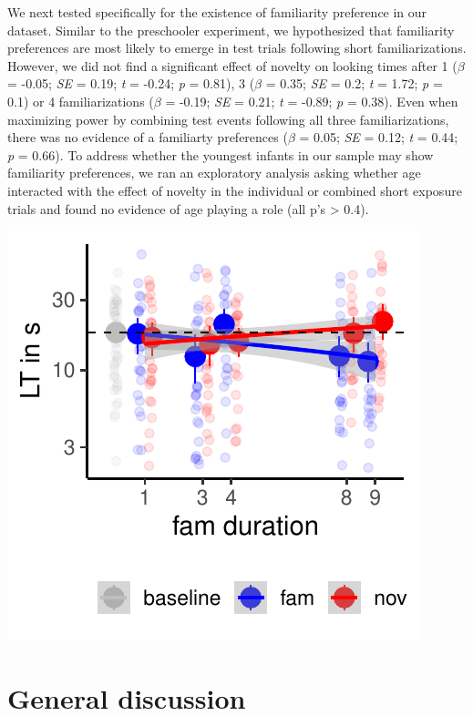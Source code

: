 \documentclass[10pt, letterpaper]{article}
\newenvironment{CodeChunk}{}{}
\begin{document}
We next tested specifically for the existence of familiarity preference
in our dataset. Similar to the preschooler experiment, we hypothesized
that familiarity preferences are most likely to emerge in test trials
following short familiarizations. However, we did not find a significant
effect of novelty on looking times after 1 (\(\beta\) = -0.05; \emph{SE}
= 0.19; \emph{t} = -0.24; \emph{p} = 0.81), 3 (\(\beta\) = 0.35;
\emph{SE} = 0.2; \emph{t} = 1.72; \emph{p} = 0.1) or 4 familiarizations
(\(\beta\) = -0.19; \emph{SE} = 0.21; \emph{t} = -0.89; \emph{p} =
0.38). Even when maximizing power by combining test events following all
three familiarizations, there was no evidence of a familiarty
preferences (\(\beta\) = 0.05; \emph{SE} = 0.12; \emph{t} = 0.44;
\emph{p} = 0.66). To address whether the youngest infants in our sample
may show familiarity preferences, we ran an exploratory analysis asking
whether age interacted with the effect of novelty in the individual or
combined short exposure trials and found no evidence of age playing a
role (all p's \textgreater{} 0.4).

\begin{CodeChunk}

\includegraphics{figs/unnamed-chunk-17-1} \end{CodeChunk}

\hypertarget{general-discussion}{%
\section{General discussion}\label{general-discussion}}
\end{document}
